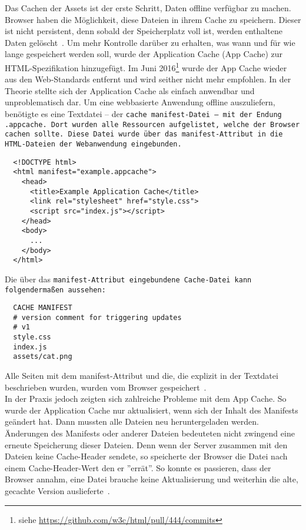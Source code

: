 Das Cachen der \gls{Assets} ist der erste Schritt, Daten offline verfügbar zu machen. Browser haben die Möglichkeit, diese Dateien in ihrem Cache zu speichern.
Dieser ist nicht persistent, denn sobald der Speicherplatz voll ist, werden enthaltene Daten gelöscht~\cite{cache}.
%
%
Um mehr Kontrolle darüber zu erhalten, was wann und für wie lange gespeichert werden soll, wurde der Application Cache (App Cache) zur \gls{HTML}-Spezifikation hinzugefügt.
Im Juni 2016\footnote{siehe \url{https://github.com/w3c/html/pull/444/commits}} wurde der App Cache wieder aus den Web-Standards entfernt und wird seither nicht mehr empfohlen.
In der Theorie stellte sich der Application Cache als einfach anwendbar und unproblematisch dar. Um eine webbasierte Anwendung offline auszuliefern, benötigte es eine Textdatei -- der \tt{cache manifest}-Datei -- mit der Endung \tt{.appcache}. Dort wurden alle Ressourcen aufgelistet, welche der Browser cachen sollte.
Diese Datei wurde über das \tt{manifest}-Attribut in die \gls{HTML}-Dateien der Webanwendung eingebunden.
%
\begin{lstlisting}
  <!DOCTYPE html>
  <html manifest="example.appcache">
    <head>
      <title>Example Application Cache</title>
      <link rel="stylesheet" href="style.css">
      <script src="index.js"></script>
    </head>
    <body>
      ...
    </body>
  </html>
\end{lstlisting}
%
Die über das \tt{manifest}-Attribut eingebundene Cache-Datei kann folgendermaßen aussehen:
\begin{lstlisting}
  CACHE MANIFEST
  # version comment for triggering updates
  # v1
  style.css
  index.js
  assets/cat.png
\end{lstlisting}
Alle Seiten mit dem manifest-Attribut und die, die explizit in der Textdatei beschrieben wurden, wurden vom Browser gespeichert~\cite{appcache}.\\
In der Praxis jedoch zeigten sich zahlreiche Probleme mit dem App Cache. So wurde der Application Cache nur aktualisiert, wenn sich der Inhalt des Manifests geändert hat. Dann mussten alle Dateien neu heruntergeladen werden.
Änderungen des Manifests oder anderer Dateien bedeuteten nicht zwingend eine erneute Speicherung dieser Dateien.
Denn wenn der Server zusammen mit den Dateien keine Cache-Header sendete, so speicherte der Browser die Datei nach einem Cache-Header-Wert den er ''errät''. So konnte es passieren, dass der Browser annahm, eine Datei brauche keine Aktualisierung und weiterhin die alte, gecachte Version auslieferte~\cite{noappcache}.\\
